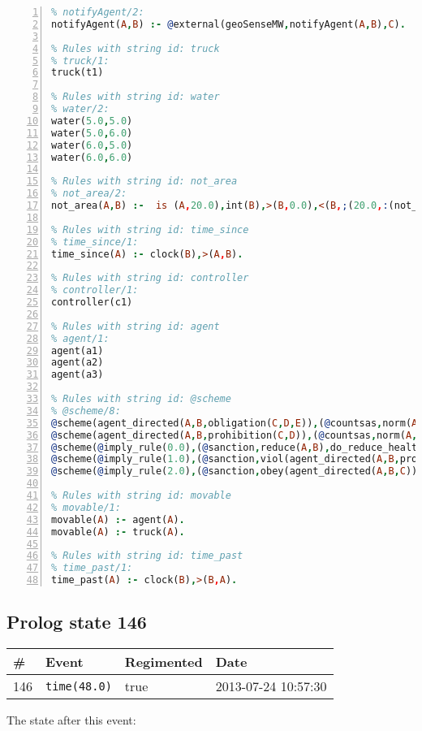 \documentclass[11pt]{article}\usepackage[utf8]{inputenc}\usepackage{geometry}
\begin{document}
\begin{lstlisting}[language=Prolog, numbers=left]
% Rules with string id: notifyAgent
% notifyAgent/2:
notifyAgent(A,B) :- @external(geoSenseMW,notifyAgent(A,B),C).

% Rules with string id: truck
% truck/1:
truck(t1)

% Rules with string id: water
% water/2:
water(5.0,5.0)
water(5.0,6.0)
water(6.0,5.0)
water(6.0,6.0)

% Rules with string id: not_area
% not_area/2:
not_area(A,B) :-  is (A,20.0),int(B),>(B,0.0),<(B,;(20.0,:(not_area(A,B), is (-(B),20.0)))),int(A),>(A,0.0),<(A,;(20.0,:(area(A,B),-(int(A))))),int(B),>(A,0.0),>(B,0.0),<(A,21.0),<(B,21.0).

% Rules with string id: time_since
% time_since/1:
time_since(A) :- clock(B),>(A,B).

% Rules with string id: controller
% controller/1:
controller(c1)

% Rules with string id: agent
% agent/1:
agent(a1)
agent(a2)
agent(a3)

% Rules with string id: @scheme
% @scheme/8:
@scheme(agent_directed(A,B,obligation(C,D,E)),(@countsas,norm(A,B,F,obligation(C,D,E)),F),false,(listTrue(C)),(time_past(D)),false,[plus(viol(agent_directed(A,B,obligation(C,D,E))))|[]],[plus(obey(agent_directed(A,B,obligation(C,D,E))))|[]])
@scheme(agent_directed(A,B,prohibition(C,D)),(@countsas,norm(A,B,E,prohibition(C,D)),E),(listTrue(C)),false,(false),false,[plus(viol(agent_directed(A,B,prohibition(C,D))))|[]],[plus(obey(agent_directed(A,B,prohibition(C,D))))|[]])
@scheme(@imply_rule(0.0),(@sanction,reduce(A,B),do_reduce_health(A,B),notifyAgent(A,changed(status))),true,false,false,false,[min(reduce(A,B))|[]],[])
@scheme(@imply_rule(1.0),(@sanction,viol(agent_directed(A,B,prohibition(C,D))),do_sanction(D)),true,false,false,false,[min(viol(agent_directed(A,B,prohibition(C,D))))|[]],[])
@scheme(@imply_rule(2.0),(@sanction,obey(agent_directed(A,B,C))),true,false,false,false,[min(obey(agent_directed(A,B,C)))|[]],[])

% Rules with string id: movable
% movable/1:
movable(A) :- agent(A).
movable(A) :- truck(A).

% Rules with string id: time_past
% time_past/1:
time_past(A) :- clock(B),>(B,A).

\end{lstlisting}
\clearpage 
\subsection{Prolog state 146}
\begin{table}[ht]
\centering 
\begin{tabular}{l l l l} 
\textbf{\#} & \textbf{Event} & \textbf{Regimented} & \textbf{Date} \\ [0.5ex] 
\hline
146&\texttt{time(48.0)}&true&2013-07-24 10:57:30\\ [1ex] \hline\end{tabular}
\end{table}
The state after this event:
\end{document}
